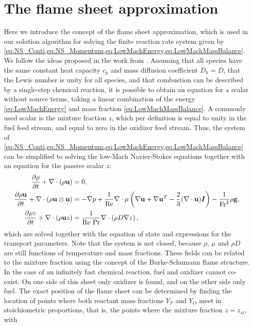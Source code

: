 \section{The flame sheet approximation} \label{sec:FlameSheet}
Here we introduce the concept of the flame sheet approximation, which is used in our solution algorithm for solving the finite reaction rate system given by \cref{eq:NS_Conti,eq:NS_Momentum,eq:LowMachEnergy,eq:LowMachMassBalance}. We follow the ideas proposed in the work from \cite{keyesFlameSheetStarting1987}.
Assuming that all species have the same constant heat capacity $c_p$ and mass diffusion coefficient $D_k=D$, that the Lewis number is unity for all species, and that combustion can be described by a single-step chemical reaction, it is possible to obtain an equation for a scalar without source terms, taking a linear combination of the energy \cref{eq:LowMachEnergy} and mass fraction \cref{eq:LowMachMassBalance}. A commonly used scalar is the mixture fraction $z$, which per definition is equal to unity in the fuel feed stream, and equal to zero in the oxidizer feed stream. Thus, the system of \cref{eq:NS_Conti,eq:NS_Momentum,eq:LowMachEnergy,eq:LowMachMassBalance} can be simplified to solving the low-Mach Navier-Stokes equations together with an equation for the passive scalar $z$:
\begin{subequations}
	\begin{align}
\frac{\partial \rho}{\partial t}+	\nabla \cdot (\rho \textbf{u})  & = 0, \label{eq:MixtFracConti2}\\ 
\frac{\partial \rho \textbf{u}}{\partial t} +	\nabla \cdot (\rho \textbf{u} \otimes \textbf{u})  & = - \nabla p + \frac{1}{\text{Re}}\nabla \cdot \mu\left( \nabla \textbf{u} +\nabla \textbf{u}^T  - \frac{2}{3}(\nabla\cdot \textbf{u})\boldsymbol I \right)  - \frac{1}{\text{Fr}^2}\rho\textbf{g},\label{eq:MixtFracMom} \\
\frac{\partial \rho z}{\partial t}+	\nabla \cdot (\rho \textbf{u}z) & = \frac{1}{\text{Re Pr}}\nabla \cdot\left(\rho D \nabla z\right), \label{eq:MixtFracMF}
	\end{align}
	\label{eq:all-eq-mixfrac}
\end{subequations}
which are solved together with the equation of state and expressions for the transport parameters. Note that the system is not closed, because $\rho$, $\mu$ and $\rho D$ are still functions of temperature and mass fractions. These fields can be related to the mixture fraction using the concept of the Burke-Schumann flame structure. \citep{burkeDiffusionFlames1928} In the case of an infinitely fast chemical reaction, fuel and oxidizer cannot co-exist. On one side of this sheet only oxidizer is found, and on the other side only fuel. The exact position of the flame sheet can be determined by finding the location of points where both reactant mass fractions $Y_F$ and $Y_O$  meet in stoichiometric proportions, that is, the points where the mixture fraction $z = z_{st}$, with
